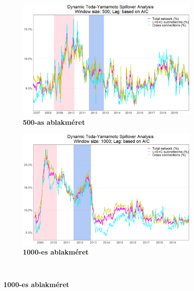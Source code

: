 \documentclass[12pt,bibliography=totoc]{article}
\begin{document}
\begin{figure}[H]
\centering
\caption{Dinamikus Toda-Yamamoto robosztusság vizsgálat}
\begin{subfigure}{.5\linewidth}
\centering
\includegraphics[width=\linewidth]{Time_series_500}
\caption{\textbf{500-as ablakméret}}

\end{subfigure}%
\begin{subfigure}{.5\linewidth}
\centering
\includegraphics[width=\linewidth]{Time_series_1000}
\caption{\textbf{1000-es ablakméret}}
\end{subfigure}\\[1ex]
\end{figure}
\end{document}
